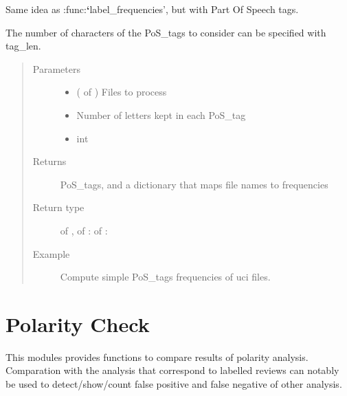\documentclass[letterpaper,10pt,english]{sphinxmanual}
\begin{document}
\begin{fulllineitems}
\label{\detokenize{analysis:loacore.analysis.frequencies.pos_tag_frequencies}}
Same idea as :func:{\color{red}\bfseries{}{}`}label\_frequencies’, but with Part Of Speech tags.

The number of characters of the PoS\_tags to consider can be specified with tag\_len.
\begin{quote}\begin{description}
\item[{Parameters}] \leavevmode\begin{itemize}
\item {} 
 ( of {\hyperref[\detokenize{classes:loacore.classes.classes.File}]{}}) \textendash{} Files to process

\item {} 
 \textendash{} Number of letters kept in each PoS\_tag

\item {} 
 \textendash{} int

\end{itemize}

\item[{Returns}] \leavevmode
PoS\_tags, and a dictionary that maps file names to frequencies

\item[{Return type}] \leavevmode
{} of  ,  of  :  of  : 

\item[{Example}] \leavevmode
Compute simple PoS\_tags frequencies of uci files.

\end{description}\end{quote}

\end{fulllineitems}



\section{Polarity Check}
\label{\detokenize{analysis:polarity-check}}
This modules provides functions to compare results of polarity analysis. Comparation with the analysis that correspond to labelled reviews can notably be used to detect/show/count false positive and false negative of other analysis.
\end{document}
